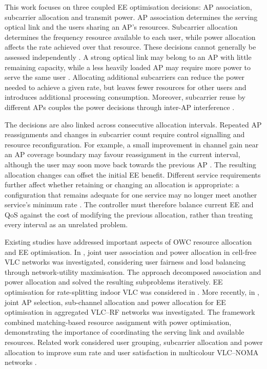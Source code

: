 \documentclass[journal]{IEEEtran}
\begin{document}
This work focuses on three coupled EE optimisation decisions: AP association, subcarrier allocation and transmit power. AP association determines the serving optical link and the users sharing an AP's resources. Subcarrier allocation determines the frequency resource available to each user, while power allocation affects the rate achieved over that resource. These decisions cannot generally be assessed independently \cite{Jiang2018,Liu2025JAPSRA}. A strong optical link may belong to an AP with little remaining capacity, while a less heavily loaded AP may require more power to serve the same user \cite{Jiang2018}. Allocating additional subcarriers can reduce the power needed to achieve a given rate, but leaves fewer resources for other users and introduces additional processing consumption. Moreover, subcarrier reuse by different APs couples the power decisions through inter-AP interference \cite{Jiang2018,Liu2025JAPSRA}.

The decisions are also linked across consecutive allocation intervals. Repeated AP reassignments and changes in subcarrier count require control signalling and resource reconfiguration. For example, a small improvement in channel gain near an AP coverage boundary may favour reassignment in the current interval, although the user may soon move back towards the previous AP \cite{Frometa2024Handover}. The resulting allocation changes can offset the initial EE benefit. Different service requirements further affect whether retaining or changing an allocation is appropriate: a configuration that remains adequate for one service may no longer meet another service's minimum rate \cite{Ncube2025Predictive,Liu2024JUGSAPA}. The controller must therefore balance current EE and QoS against the cost of modifying the previous allocation, rather than treating every interval as an unrelated problem.

Existing studies have addressed important aspects of OWC resource allocation and EE optimisation. In \cite{Jiang2018}, joint user association and power allocation in cell-free VLC networks was investigated, considering user fairness and load balancing through network-utility maximisation. The approach decomposed association and power allocation and solved the resulting subproblems iteratively. EE optimisation for rate-splitting indoor VLC was considered in \cite{Xing2022}. More recently, in \cite{Liu2025JAPSRA}, joint AP selection, sub-channel allocation and power allocation for EE optimisation in aggregated VLC--RF networks was investigated. The framework combined matching-based resource assignment with power optimisation, demonstrating the importance of coordinating the serving link and available resources. Related work considered user grouping, subcarrier allocation and power allocation to improve sum rate and user satisfaction in multicolour VLC--NOMA networks \cite{Liu2024JUGSAPA}.
\end{document}
